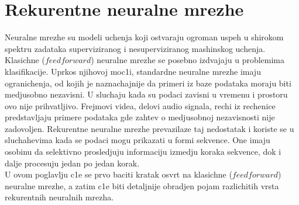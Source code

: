 \documentclass[a4paper, openany, oneside, 11pt]{book}
\begin{document}
\chapter{Rekurentne neuralne mrezhe}
Neuralne mrezhe su modeli uchenja koji ostvaraju ogroman uspeh u shirokom spektru zadataka superviziranog i nesuperviziranog mashinskog uchenja. Klasichne ($feedforward$) neuralne mrezhe se posebno izdvajaju u problemima klasifikacije. Uprkos njihovoj moc1i, standardne neuralne mrezhe imaju ogranichenja, od kojih je naznachajnije da primeri iz baze podataka moraju biti medjusobno nezavisni. U sluchaju kada su podaci zavisni u vremenu i prostoru ovo nije prihvatljivo. Frejmovi videa, delovi audio signala, rechi iz rechenice predstavljaju primere podataka gde zahtev o medjusobnoj nezavisnosti nije zadovoljen. Rekurentne neuralne mrezhe prevazilaze taj nedostatak i koriste se u sluchahevima kada se podaci mogu prikazati u formi sekvence. One imaju osobinu da selektivno prosledjuju informaciju izmedju koraka sekvence, dok i dalje procesuju jedan po jedan korak.\\
U ovom poglavlju c1e se prvo baciti kratak osvrt na klasichne ($feedforward$) neuralne mrezhe, a zatim c1e biti detaljnije obradjen pojam razlichitih vrsta rekurentnih neuralnih mrezha.
\end{document}
